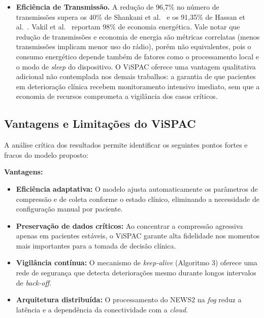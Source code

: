 \documentclass[twoside,english,brazilian]{UNISINOSmonografia}
\begin{document}
\begin{itemize}
\item\textbf{Eficiência de Transmissão.} A redução de 96,7\% no número de transmissões supera os 40\% de Shankani et al.~\cite{Shankani2025} e os 91,35\% de Hassan et al.~\cite{Hassan2024}. Vakil et al.~\cite{Vakil2024} reportam 98\% de economia energética. Vale notar que redução de transmissões e economia de energia são métricas correlatas (menos transmissões implicam menor uso do rádio), porém não equivalentes, pois o consumo energético depende também de fatores como o processamento local e o modo de \textit{sleep} do dispositivo. O ViSPAC oferece uma vantagem qualitativa adicional não contemplada nos demais trabalhos: a garantia de que pacientes em deterioração clínica recebem monitoramento intensivo imediato, sem que a economia de recursos comprometa a vigilância dos casos críticos.
\end{itemize}

\subsection{Vantagens e Limitações do ViSPAC}
A análise crítica dos resultados permite identificar os seguintes pontos fortes e fracos do modelo proposto:

\textbf{Vantagens:}
\begin{itemize}
\item \textbf{Eficiência adaptativa:} O modelo ajusta automaticamente os parâmetros de compressão e de coleta conforme o estado clínico, eliminando a necessidade de configuração manual por paciente.
\item \textbf{Preservação de dados críticos:} Ao concentrar a compressão agressiva apenas em pacientes estáveis, o ViSPAC garante alta fidelidade nos momentos mais importantes para a tomada de decisão clínica.
\item \textbf{Vigilância contínua:} O mecanismo de \textit{keep-alive} (Algoritmo 3) oferece uma rede de segurança que detecta deteriorações mesmo durante longos intervalos de \textit{back-off}.
\item \textbf{Arquitetura distribuída:} O processamento do NEWS2 na \textit{fog} reduz a latência e a dependência da conectividade com a \textit{cloud}.
\end{itemize}
\end{document}
